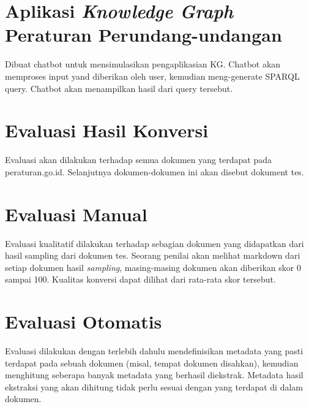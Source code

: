 \section{Aplikasi \textit{Knowledge Graph} Peraturan Perundang-undangan}
\label{sec:latex}
Dibuat chatbot untuk mensimulasikan pengaplikasian KG. Chatbot akan memproses input yand diberikan
oleh user, kemudian meng-generate SPARQL query. Chatbot akan menampilkan hasil dari query tersebut.

\section{Evaluasi Hasil Konversi}
\label{sec:latex}
Evaluasi akan dilakukan terhadap semua dokumen yang terdapat pada peraturan.go.id. Selanjutnya
dokumen-dokumen ini akan disebut dokument tes.

\section{Evaluasi Manual}
\label{sec:latex}
Evaluasi kualitatif dilakukan terhadap sebagian dokumen yang didapatkan dari hasil sampling dari
dokumen tes. Seorang penilai akan melihat markdown dari setiap dokumen hasil \textit{sampling},
masing-masing dokumen akan diberikan skor 0 sampai 100. Kualitas konversi dapat dilihat dari
rata-rata skor tersebut.

\section{Evaluasi Otomatis}
\label{sec:latex}
Evaluasi dilakukan dengan terlebih dahulu mendefinisikan metadata yang pasti terdapat pada sebuah
dokumen (misal, tempat dokumen disahkan), kemudian menghitung seberapa banyak metadata yang berhasil
diekstrak. Metadata hasil ekstraksi yang akan dihitung tidak perlu sesuai dengan yang terdapat di
dalam dokumen.

